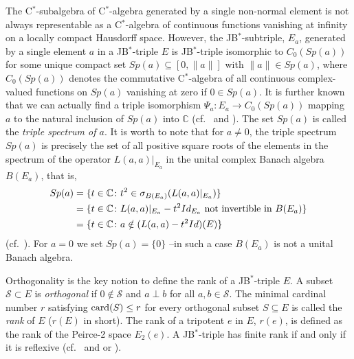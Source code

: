 \documentclass[10pt]{amsart}
\begin{document}
The C$^*$-subalgebra of C$^*$-algebra generated by a single non-normal element is not always representable as a C$^*$-algebra of continuous functions vanishing at infinity on a locally compact Hausdorff space. However, the JB$^*$-subtriple, $E_a$, generated by a single element $a$ in a JB$^*$-triple $E$ is JB$^*$-triple isomorphic to $C_0(Sp(a))$ for some unique compact set $Sp(a) \subseteq [0,\|a\|]$ with $\|a\| \in Sp(a)$, where $C_0(Sp(a))$ denotes the commutative C$^*$-algebra of all continuous complex-valued functions on $Sp(a)$ vanishing at zero if $0\in Sp(a)$. It is further known that we can actually find a triple isomorphism $\Psi_a\colon E_a \longrightarrow C_0(Sp(a))$ mapping $a$ to the natural inclusion of $Sp(a)$ into $\mathbb{C}$ (cf.\ \cite[Corollary 1.15]{Ka83} and \cite[Proposition 3.5$(iii)$]{Ka96}). The set $Sp(a)$ is called the  \emph{triple spectrum of $a$}. It is worth to note that for $a\neq 0$, the triple spectrum $Sp(a)$ is precisely the set of all positive square roots of the elements in the spectrum of the operator $L(a,a)|_{E_a}$ in the unital complex Banach algebra $B(E_a)$, that is, $$\begin{aligned}
	Sp(a) &=\{t\in \mathbb{C}\colon t^2 \in \sigma_{B(E_a)} (L(a,a)|_{E_a}) \} \\
	&= \{ t \in \mathbb{C} \colon L(a,a)|_{E_a}- t^2 Id_{E_a} \hbox{ not invertible in }  B(E_a) \}\\
	&= \{ t \in \mathbb{C}\colon a \notin (L(a,a)-t^2 Id) (E)\}
\end{aligned}$$ 
(cf.\ \cite[Corollary 3.4]{Ka96}). For $a =0$ we set $Sp(a) = \{0\}$ --in such a case $B(E_a)$ is not a unital Banach algebra.
	
Orthogonality is the key notion to define the rank of a JB$^*$-triple $E$. A subset $\mathcal{S}\subset E$ is \emph{orthogonal} if $0\notin \mathcal{S}$ and $a\perp b$ for all $a,b\in \mathcal{S}$. The minimal cardinal number $r$ satisfying $\hbox{card}(S) \leq r$ for every orthogonal subset $S \subseteq E$ is called the \emph{rank} of $E$ ($r(E)$ in short). The rank of a tripotent $e$ in $E$, $r(e)$, is defined as the rank of the Peirce-2 space $E_2(e)$. A JB$^*$-triple has finite rank if and only if it is reflexive (cf.\ \cite[Proposition 4.5]{BuChu92} and \cite[Theorem 6]{ChuIo90} or \cite{BeLoRo03, BeLoPeRo04}).
	
\end{document}
